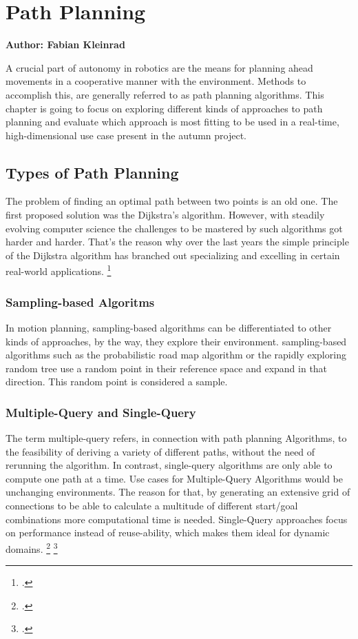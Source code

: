 \chapter{Path Planning}
\label{chapter:path_planning}

\textbf{Author: Fabian Kleinrad} 

A crucial part of autonomy in robotics are the means for planning ahead movements in a cooperative manner with the environment. Methods to accomplish this, are generally referred to as path planning algorithms. This chapter is going to focus on exploring different kinds of approaches to path planning and evaluate which approach is most fitting to be used in a real-time, high-dimensional use case present in the autumn project.


\section{Types of Path Planning}

The problem of finding an optimal path between two points is an old one.
The first proposed solution was the Dijkstra's algorithm. However, with steadily evolving computer science the challenges to be mastered by such algorithms got harder and harder. That's the reason why over the last years the simple principle of the Dijkstra algorithm has branched out specializing and excelling in certain real-world applications.
\footcite{Pan2020}

\subsection{Sampling-based Algoritms}

In motion planning, sampling-based algorithms can be differentiated to other kinds of approaches, by the way, they explore their environment. sampling-based algorithms such as the probabilistic road map algorithm or the rapidly exploring random tree use a random point in their reference space and expand in that direction. This random point is considered a sample.

\subsection{Multiple-Query and Single-Query}

The term multiple-query refers, in connection with path planning Algorithms, to the feasibility of deriving a variety of different paths, without the need of rerunning the algorithm. In contrast, single-query algorithms are only able to compute one path at a time.\newline
Use cases for Multiple-Query Algorithms would be unchanging environments. The reason for that, by generating an extensive grid of connections to be able to calculate a multitude of different start/goal combinations  more computational time is needed.\newline
Single-Query approaches focus on performance instead of reuse-ability, which makes them ideal for dynamic domains. 
\footcite{Bekris2003}
\footcite{stackexchangeMultiSingleQuery2019}

